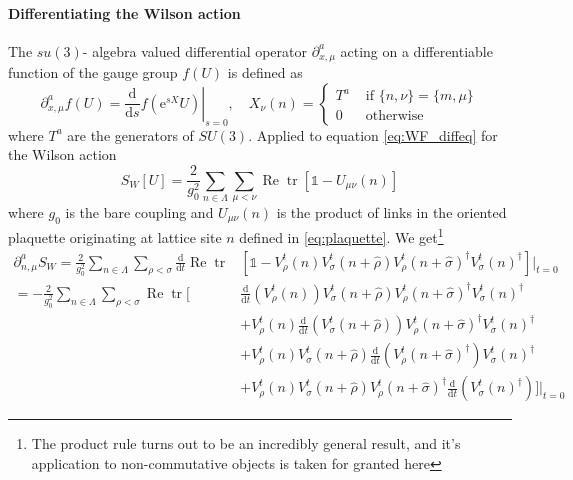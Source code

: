 \documentclass[a4paper,10pt]{book}
\begin{document}
\paragraph{Differentiating the Wilson action}
The $su(3)$- algebra valued differential operator $\partial^a_{x,\mu}$ acting on a differentiable function of the gauge group $f(U)$ is defined as
\begin{equation}\label{eq:diffOponGaugeGroup}
\partial_{x, \mu}^{a} f(U)=\left.\frac{\mathrm{d}}{\mathrm{d} s} f\left(\mathrm{e}^{s X} U\right)\right|_{s=0}, \quad X_\nu(n)= \begin{cases}T^{a} & \text { if }\{n, \nu\}=\{m, \mu\} \\ 0 & \text { otherwise }\end{cases}
\end{equation}
where $T^a$ are the generators of $SU(3)$. Applied to equation \eqref{eq:WF_diffeq} for the Wilson action
\begin{equation}
S_{W}[U]=\frac{2}{g_0^{2}} \sum_{n \in \Lambda} \sum_{\mu<\nu} \operatorname{Re} \operatorname{tr}\left[\mathbb{1}-U_{\mu \nu}(n)\right]
\end{equation}
where $g_0$ is the bare coupling and $U_{\mu \nu}(n)$ is the product of links in the oriented plaquette originating at lattice site $n$ defined in \eqref{eq:plaquette}.
We get\footnote{The product rule turns out to be an incredibly general result, and it's application to non-commutative objects is taken for granted here}
\begin{equation}
\begin{aligned} 
\partial_{n, \mu}^{a}S_W = \frac{2}{g_0^{2}} \sum_{n \in \Lambda} \sum_{\rho<\sigma} \frac{\mathrm{d}}{\mathrm{d} t}\operatorname{Re} \operatorname{tr}&\left[\mathbb{1}-V^t_{\rho}(n) V^t_{\sigma}(n+\hat{\rho}) V^t_{\rho}(n+\hat{\sigma})^{\dagger} V^t_{\sigma}(n)^{\dagger}\right]\Big|_{t=0}\\
= -\frac{2}{g_0^{2}} \sum_{n \in \Lambda} \sum_{\rho<\sigma} \operatorname{Re} \operatorname{tr}\Bigg[&\frac{\mathrm{d}}{\mathrm{d} t}\left( V^t_{\rho}(n) \right) V^t_{\sigma}(n+\hat{\rho}) V^t_{\rho}(n+\hat{\sigma})^{\dagger} V^t_{\sigma}(n)^{\dagger}\\ &+V^t_{\rho}(n)\frac{\mathrm{d}}{\mathrm{d} t} \left( V^t_{\sigma}(n+\hat{\rho}) \right) V^t_{\rho}(n+\hat{\sigma})^{\dagger} V^t_{\sigma}(n)^{\dagger}\\&+V^t_{\rho}(n) V^t_{\sigma}(n+\hat{\rho}) \frac{\mathrm{d}}{\mathrm{d} t}\left( V^t_{\rho}(n+\hat{\sigma})^{\dagger} \right) V^t_{\sigma}(n)^{\dagger}\\&+ V^t_{\rho}(n) V^t_{\sigma}(n+\hat{\rho}) V^t_{\rho}(n+\hat{\sigma})^{\dagger} \frac{\mathrm{d}}{\mathrm{d} t}\left( V^t_{\sigma}(n)^{\dagger} \right)\Bigg]\Bigg|_{t=0}
\end{aligned}
\end{equation}
\end{document}
